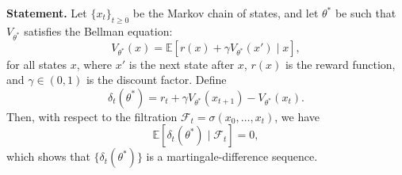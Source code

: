 \begin{lemma}
\label{lemma:td-error-mds}
\textbf{Statement.}
Let \( \{x_t\}_{t \geq 0} \) be the Markov chain of states, and let \( \theta^* \) be such that \( V_{\theta^*} \) satisfies the Bellman equation:
\[
V_{\theta^*}(x) = \mathbb{E}\left[ r(x) + \gamma V_{\theta^*}(x') \mid x \right],
\]
for all states \( x \), where \( x' \) is the next state after \( x \), \( r(x) \) is the reward function, and \( \gamma \in (0,1) \) is the discount factor. Define
\[
\delta_t(\theta^*) = r_t + \gamma V_{\theta^*}(x_{t+1}) - V_{\theta^*}(x_t).
\]
Then, with respect to the filtration \( \mathcal{F}_t = \sigma(x_0, \dots, x_t) \), we have
\[
\mathbb{E}\left[ \delta_t(\theta^*) \mid \mathcal{F}_t \right] = 0,
\]
which shows that \( \{\delta_t(\theta^*)\} \) is a martingale-difference sequence.
\end{lemma}

